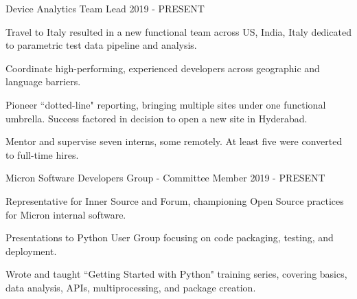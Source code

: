 

\begin{cventries}

  \cventry
    {Device Analytics Team Lead} %
    {} %
    {} %
    {2019 - PRESENT} %
    {
      \begin{cvitems} %
        \item {Travel to Italy resulted in a new functional team across US, India, Italy dedicated to parametric test data pipeline and analysis.}
        \item {Coordinate high-performing, experienced developers across geographic and language barriers.}
        \item {Pioneer ``dotted-line" reporting, bringing multiple sites under one functional umbrella. Success factored in decision to open a new site in Hyderabad.}
        \item {Mentor and supervise seven interns, some remotely. At least five were converted to full-time hires.}
      \end{cvitems}
    }
  \cventry
    {Micron Software Developers Group - Committee Member} %
    {} %
    {} %
    {2019 - PRESENT} %
    {
      \begin{cvitems} %
        \item {Representative for Inner Source and Forum, championing Open Source practices for Micron internal software.}
        \item {Presentations to Python User Group focusing on code packaging, testing, and deployment.}
        \item {Wrote and taught ``Getting Started with Python" training series, covering basics, data analysis, APIs, multiprocessing, and package creation.}
      \end{cvitems}
    }
\end{cventries}
